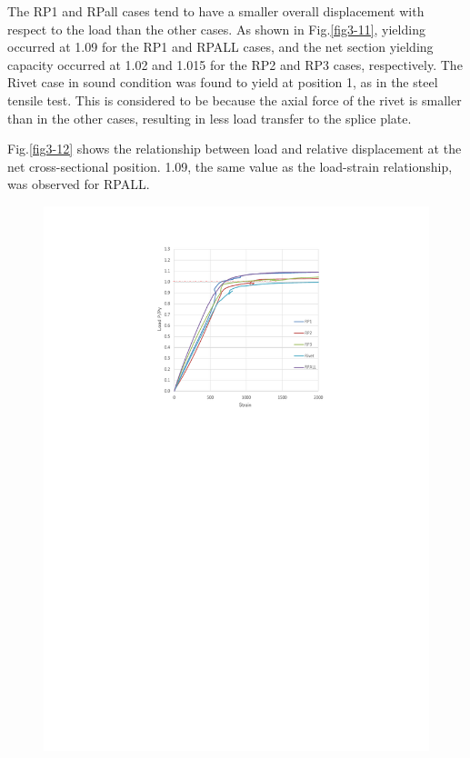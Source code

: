 The RP1 and RPall cases tend to have a smaller overall displacement with respect to the load than the other cases. As shown in Fig.\ref{fig3-11}, yielding occurred at 1.09 for the RP1 and RPALL cases, and the net section yielding capacity occurred at 1.02 and 1.015 for the RP2 and RP3 cases, respectively. The Rivet case in sound condition was found to yield at position 1, as in the steel tensile test. This is considered to be because the axial force of the rivet is smaller than in the other cases, resulting in less load transfer to the splice plate.


Fig.\ref{fig3-12} shows the relationship between load and relative displacement at the net cross-sectional position. 1.09, the same value as the load-strain relationship, was observed for RPALL.

\begin{figure}[htbp]
    \centering
    \begin{minipage}[t]{0.42\textwidth}
    \includegraphics[width=\linewidth]{imgs/ch3/fig3-11.pdf}

\end{minipage}
\end{figure}
